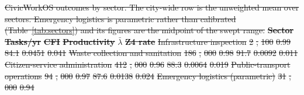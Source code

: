 \documentclass[utf8]{FrontiersinHarvard}
\providecommand{\DIFdel}[1]{{\protect\color{red}\sout{#1}}}                      %
\providecommand{\DIFdelFL}[1]{\DIFdel{#1}} %
\begin{document}
{%
\DIFdelFL{CivicWorkOS outcomes by sector. The city-wide row is the unweighted mean over sectors. Emergency logistics is parametric rather than calibrated (Table~\ref{tab:sectors}) and its figures are the midpoint of the swept range.}}
\textbf{\DIFdelFL{Sector}} %
\textbf{\DIFdelFL{Tasks/yr}} %
\textbf{\DIFdelFL{CFI}} %
\textbf{\DIFdelFL{Productivity}} %
\textbf{\DIFdelFL{$\bar\lambda$}} %
\textbf{\DIFdelFL{Z4 rate}}%
\DIFdelFL{Infrastructure inspection }%
\DIFdelFL{2}%
\DIFdelFL{,}%
\DIFdelFL{100 }%
\DIFdelFL{0.99 }%
\DIFdelFL{84.1 }%
\DIFdelFL{0.0451 }%
\DIFdelFL{0.041}%
\DIFdelFL{Waste collection and sanitation }%
\DIFdelFL{186}%
\DIFdelFL{,}%
\DIFdelFL{000 }%
\DIFdelFL{0.98 }%
\DIFdelFL{91.7 }%
\DIFdelFL{0.0092 }%
\DIFdelFL{0.011}%
\DIFdelFL{Citizen-service administration }%
\DIFdelFL{412}%
\DIFdelFL{,}%
\DIFdelFL{000 }%
\DIFdelFL{0.96 }%
\DIFdelFL{88.3 }%
\DIFdelFL{0.0064 }%
\DIFdelFL{0.019}%
\DIFdelFL{Public-transport operations }%
\DIFdelFL{94}%
\DIFdelFL{,}%
\DIFdelFL{000 }%
\DIFdelFL{0.97 }%
\DIFdelFL{87.6 }%
\DIFdelFL{0.0138 }%
\DIFdelFL{0.024}%
\DIFdelFL{Emergency logistics (parametric) }%
\DIFdelFL{31}%
\DIFdelFL{,}%
\DIFdelFL{000 }%
\DIFdelFL{0.94 }%
\end{document}
